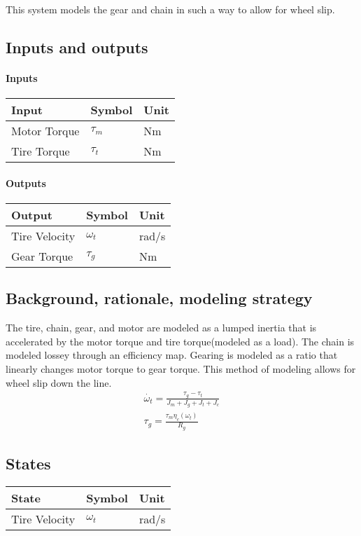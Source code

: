 \documentclass[../SimBALink.tex]{subfiles}
\begin{document}
This system models the gear and chain in such a way to allow for wheel slip. 

\subsection{Inputs and outputs}
	\paragraph{Inputs}
	\begin{tabular}{ l | l | l  }
		Input					&	Symbol		&	Unit		\\	\hline
		Motor Torque			& 	$\tau_m$ 		& Nm \\
		Tire Torque				&	$\tau_t$	&	Nm
	\end{tabular}
	
	\paragraph{Outputs}
	\begin{tabular}{ l | l | l  }
		Output					&	Symbol		&	Unit		\\	\hline
		Tire Velocity		&	$\omega_t$		&	rad/s \\
		Gear Torque			&	$\tau_g$		& Nm
	\end{tabular}

\subsection{Background, rationale, modeling strategy}
The tire, chain, gear, and motor are modeled as a lumped inertia that is accelerated by the motor torque and tire torque(modeled as a load). The chain is modeled lossey through an efficiency map. Gearing is modeled as a ratio that linearly changes motor torque to gear torque. This method of modeling allows for wheel slip down the line.
		\begin{gather}
		\dot{\omega_t} = \frac{\tau_g - \tau_t}{J_m + J_g + J_t + J_c} \\
		\tau_g = \frac{\tau_m \eta_c (\omega_t)}{R_g}
		\end{gather}

\subsection{States}
	\begin{tabular}{ l | l | l  }
		State					&	Symbol		&	Unit		\\	\hline
		Tire Velocity 			&	$\omega_t$	&	rad/s
	\end{tabular}
\end{document}
